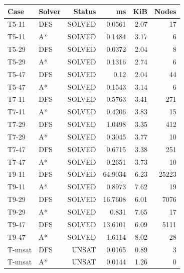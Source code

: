 \begin{center}\small
\begin{tabular}{llrrrr}
\toprule
Case & Solver & Status & ms & KiB & Nodes \\
\midrule
T5-11 & DFS & SOLVED & 0.0561 & 2.07 & 17 \\
T5-11 & A* & SOLVED & 0.1484 & 3.17 & 6 \\
T5-29 & DFS & SOLVED & 0.0372 & 2.04 & 8 \\
T5-29 & A* & SOLVED & 0.1316 & 2.74 & 6 \\
T5-47 & DFS & SOLVED & 0.12 & 2.04 & 44 \\
T5-47 & A* & SOLVED & 0.1543 & 3.14 & 6 \\
T7-11 & DFS & SOLVED & 0.5763 & 3.41 & 271 \\
T7-11 & A* & SOLVED & 0.4206 & 3.83 & 15 \\
T7-29 & DFS & SOLVED & 1.0498 & 3.35 & 412 \\
T7-29 & A* & SOLVED & 0.3045 & 3.77 & 10 \\
T7-47 & DFS & SOLVED & 0.6715 & 3.38 & 251 \\
T7-47 & A* & SOLVED & 0.2651 & 3.73 & 10 \\
T9-11 & DFS & SOLVED & 64.9034 & 6.23 & 25223 \\
T9-11 & A* & SOLVED & 0.8973 & 7.62 & 19 \\
T9-29 & DFS & SOLVED & 16.7608 & 6.01 & 7076 \\
T9-29 & A* & SOLVED & 0.831 & 7.65 & 17 \\
T9-47 & DFS & SOLVED & 13.6101 & 6.09 & 5111 \\
T9-47 & A* & SOLVED & 1.6114 & 8.02 & 28 \\
T-unsat & DFS & UNSAT & 0.0165 & 0.89 & 3 \\
T-unsat & A* & UNSAT & 0.0144 & 1.26 & 0 \\
\bottomrule
\end{tabular}\end{center}